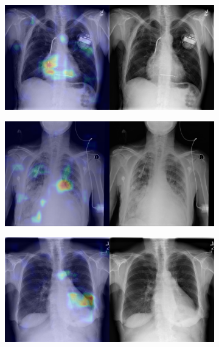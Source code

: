 \begin{figure}[b]
    \centering
    \begin{subfigure}{0.4\textwidth}
        \centering
        \includegraphics[width=1.0\textwidth]{Chapters/5. Conclusiones/img/Cardiomegaly/1_0_00000013_037.png}
    \end{subfigure}
    \begin{subfigure}{0.4\textwidth}
        \centering
        \includegraphics[width=1.0\textwidth]{Chapters/5. Conclusiones/img/Cardiomegaly/1_0_00000211_018.png}
    \end{subfigure}
    \begin{subfigure}{0.4\textwidth}
        \centering
        \includegraphics[width=1.0\textwidth]{Chapters/5. Conclusiones/img/Cardiomegaly/1_0_00000732_008.png}

\end{subfigure}
\end{figure}
